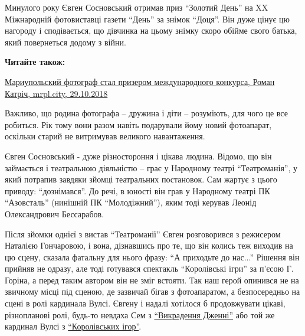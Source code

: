 Минулого року Євген Сосновський отримав приз \enquote{Золотий День} на XX Міжнародній
фотовиставці газети \enquote{День} за знімок \enquote{Доця}. Він дуже цінує цю нагороду і
сподівається, що дівчинка на цьому знімку скоро обійме свого батька, який
повернеться додому з війни.

\textbf{Читайте також:} 

\href{https://mrpl.city/news/view/mariupolskij-fotograf-stal-prizerom-mezhdunarodnogo-konkursa-foto}{%
Мариупольский фотограф стал призером международного конкурса, Роман Катріч, mrpl.city, 29.10.2018}


Важливо, що родина фотографа – дружина і діти – розуміють, для чого це все
робиться. Рік тому вони разом навіть подарували йому новий фотоапарат, оскільки
старий не витримував великого навантаження.

Євген Сосновський - дуже різностороння і цікава людина. Відомо, що він
займається і театральною діяльністю – грає у Народному театрі \enquote{Театроманія}, у
який потрапив завдяки зйомці театральних постановок. Сам жартує з цього
приводу: \enquote{дознімався}. До речі, в юності він грав у Народному театрі ПК
\enquote{Азовсталь} (нинішній ПК \enquote{Молодіжний}), яким тоді керував Леонід Олександрович
Бессарабов.


Після зйомки однієї з вистав \enquote{Театроманії} Євген розговорився з
режисером Наталією Гончаровою, і вона, дізнавшись про те, що він колись теж
виходив на цю сцену, сказала фатальну для нього фразу: \enquote{А приходьте до нас...}
Рішення він прийняв не одразу, але тоді готувався спектакль \enquote{Королівські ігри}
за п'єсою Г. Горіна, а перед таким автором він не зміг встояти. Так наш герой
опинився не на звичному місці під сценою, де зазвичай бігав з фотоапаратом, а
безпосередньо на сцені в ролі кардинала Вулсі. Євгену і надалі хотілося б
продовжувати цікаві, різнопланові ролі, будь-то невдаха Сем з \href{https://mrpl.city/blogs/view/v-dk-molodezhnyj-pohitili-dzhenni}{%
\enquote{Викрадення Дженні}} або той же кардинал Вулсі з \href{https://mrpl.city/blogs/view/korolevskie-igry-narodnogo-teatra-teatromaniya}{\enquote{Королівських ігор}}.

